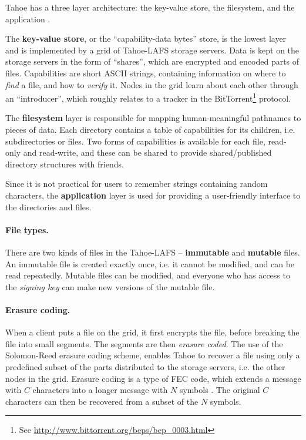 \documentclass[english,12pt,a4paper]{book}
\begin{document}
Tahoe has a three layer architecture: the key-value store, the filesystem, and
the application \cite{t_tahoe}.

The \textbf{key-value store}, or the ``capability-data bytes'' store, is the
lowest layer and is implemented by a grid of Tahoe-LAFS storage servers. Data is
kept on the storage servers in the form of ``shares'', which are encrypted and
encoded parts of files. Capabilities are short ASCII strings, containing
information on where to \emph{find} a file, and how to \emph{verify} it.
Nodes in the grid learn about each other through an ``introducer'', which
roughly relates to a tracker in the BitTorrent\footnote{See
\url{http://www.bittorrent.org/beps/bep\_0003.html}} protocol.

The \textbf{filesystem} layer is responsible for mapping human-meaningful
pathnames to pieces of data. Each directory contains a table of capabilities
for its children, i.e. subdirectories or files. Two forms of capabilities is
available for each file, read-only and read-write, and these can be shared to
provide shared/published directory structures with friends.

Since it is not practical for users to remember strings containing random
characters, the \textbf{application} layer is used for providing a user-friendly
interface to the directories and files.

\paragraph{File types.}

There are two kinds of files in the Tahoe-\ac{LAFS} -- \textbf{immutable} and
\textbf{mutable} files. An immutable file is created exactly once, i.e. it
cannot be modified, and can be read repeatedly. Mutable files can be modified,
and everyone who has access to the \emph{signing key} can make new versions of
the mutable file.

\paragraph{Erasure coding.}

When a client puts a file on the grid, it first encrypts the file, before
breaking the file into small segments. The segments are then \emph{erasure
coded}.  The use of the Solomon-Reed erasure coding scheme, enables Tahoe to
recover a file using only a predefined subset of the parts distributed to the
storage servers, i.e. the other nodes in the grid. Erasure coding is a type of
\ac{FEC} code, which extends a message with $C$ characters into a longer message
with $N$ symbols \cite{t_reed-solomon}.  The original $C$ characters can then be
recovered from a subset of the $N$ symbols.
\end{document}
